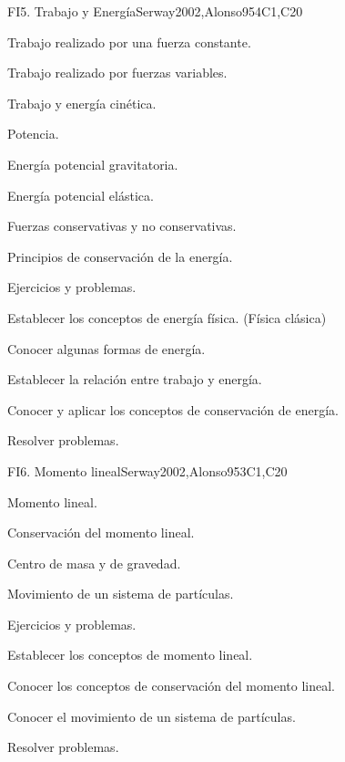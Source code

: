 \begin{syllabus}
\begin{unit}{FI5. Trabajo y Energía}{}{Serway2002,Alonso95}{4}{C1,C20}
\begin{topics}
	\item Trabajo realizado por una fuerza constante.
	\item Trabajo realizado por fuerzas variables.
	\item Trabajo y energía cinética.
	\item Potencia.
	\item Energía potencial gravitatoria.
	\item Energía potencial elástica.
	\item Fuerzas conservativas y no conservativas.
	\item Principios de conservación de la energía.
	\item Ejercicios y problemas.
\end{topics}

   \begin{learningoutcomes}
      \item Establecer los conceptos de energía física. (Física clásica)
      \item Conocer algunas formas de energía.
      \item Establecer la relación entre trabajo y energía.
      \item Conocer y aplicar los conceptos de conservación de energía.
      \item Resolver problemas.
   \end{learningoutcomes}
\end{unit}

\begin{unit}{FI6. Momento lineal}{}{Serway2002,Alonso95}{3}{C1,C20}
\begin{topics}
      \item Momento lineal.
      \item Conservación del momento lineal.
      \item Centro de masa y de gravedad.
      \item Movimiento de un sistema de partículas.
      \item Ejercicios y problemas.
  \end{topics}

   \begin{learningoutcomes}
      \item Establecer los conceptos de momento lineal.
      \item Conocer los conceptos de conservación del momento lineal.
      \item Conocer el movimiento de un sistema de partículas.
      \item Resolver problemas.
   \end{learningoutcomes}
\end{unit}


\end{syllabus}
